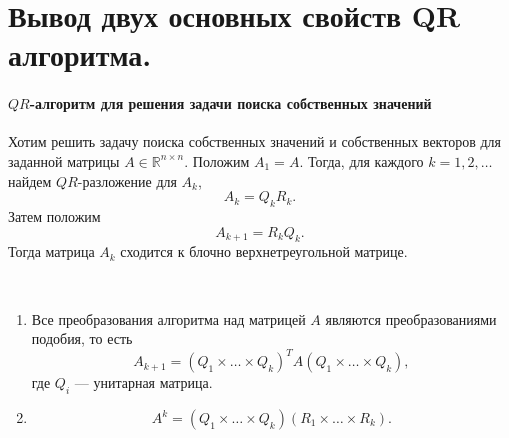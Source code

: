 \section{Вывод двух основных свойств QR алгоритма.}

\paragraph{$QR$-алгоритм для решения задачи поиска собственных значений}

Хотим решить задачу поиска собственных значений и собственных векторов для заданной матрицы $A \in \mathbb{R}^{n \times n}$.
Положим $A_{1} = A$.
Тогда, для каждого $k = 1, 2, \dots$ найдем $QR$-разложение для $A_{k}$,
\begin{equation} \label{q07::eq::1}
    A_{k} = Q_{k} R_{k}.
\end{equation}
Затем положим
\begin{equation} \label{q07::eq::2}
    A_{k + 1} = R_{k} Q_{k}.
\end{equation}
Тогда матрица $A_{k}$ сходится к блочно верхнетреугольной матрице.

\begin{properties}~
    \begin{enumerate}
        \item Все преобразования алгоритма над матрицей $A$ являются преобразованиями подобия, то есть
        \[
            A_{k + 1} = (Q_{1} \times \ldots \times Q_{k})^{T} A (Q_{1} \times \ldots \times Q_{k}),
        \]
        где $Q_{i}$ --- унитарная матрица.
        \item
        \[
            A^{k} = (Q_{1} \times \ldots \times Q_{k}) (R_{1} \times \ldots \times R_{k}).
        \]
    \end{enumerate}
\end{properties}


